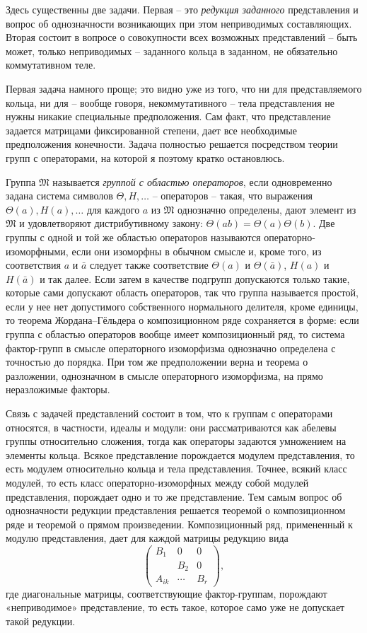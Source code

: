 \documentclass[11pt]{article}
\begin{document}
Здесь существенны две задачи. Первая -- это \emph{редукция заданного} представления и вопрос об однозначности возникающих при этом неприводимых составляющих. Вторая состоит в вопросе о совокупности всех возможных представлений -- быть может, только неприводимых -- заданного кольца в заданном, не обязательно коммутативном теле.

Первая задача намного проще; это видно уже из того, что ни для представляемого кольца, ни для -- вообще говоря, некоммутативного -- тела представления не нужны никакие специальные предположения. Сам факт, что представление задается матрицами фиксированной степени, дает все необходимые предположения конечности. Задача полностью решается посредством теории групп с операторами, на которой я поэтому кратко остановлюсь.

Группа $\mathfrak{M}$ называется \emph{группой с областью операторов}, если одновременно задана система символов $\Theta,H,\ldots$ -- операторов -- такая, что выражения $\Theta(a),H(a),\ldots$ для каждого $a$ из $\mathfrak{M}$ однозначно определены, дают элемент из $\mathfrak{M}$ и удовлетворяют дистрибутивному закону: $\Theta(ab)=\Theta(a)\Theta(b)$. Две группы с одной и той же областью операторов называются операторно-изоморфными, если они изоморфны в обычном смысле и, кроме того, из соответствия $a$ и $\bar a$ следует также соответствие $\Theta(a)$ и $\Theta(\bar a)$, $H(a)$ и $H(\bar a)$ и так далее. Если затем в качестве подгрупп допускаются только такие, которые сами допускают область операторов, так что группа называется простой, если у нее нет допустимого собственного нормального делителя, кроме единицы, то теорема Жордана--Гёльдера о композиционном ряде сохраняется в форме: если группа с областью операторов вообще имеет композиционный ряд, то система фактор-групп в смысле операторного изоморфизма однозначно определена с точностью до порядка. При том же предположении верна и теорема о разложении, однозначном в смысле операторного изоморфизма, на прямо неразложимые факторы.

Связь с задачей представлений состоит в том, что к группам с операторами относятся, в частности, идеалы и модули: они рассматриваются как абелевы группы относительно сложения, тогда как операторы задаются умножением на элементы кольца. Всякое представление порождается модулем представления, то есть модулем относительно кольца и тела представления. Точнее, всякий класс модулей, то есть класс операторно-изоморфных между собой модулей представления, порождает одно и то же представление. Тем самым вопрос об однозначности редукции представления решается теоремой о композиционном ряде и теоремой о прямом произведении. Композиционный ряд, примененный к модулю представления, дает для каждой матрицы редукцию вида
\[
\begin{pmatrix}
B_1&0&0\\
&B_2&0\\
A_{ik}&\cdots&B_r
\end{pmatrix},
\]
где диагональные матрицы, соответствующие фактор-группам, порождают «неприводимое» представление, то есть такое, которое само уже не допускает такой редукции.
\end{document}
